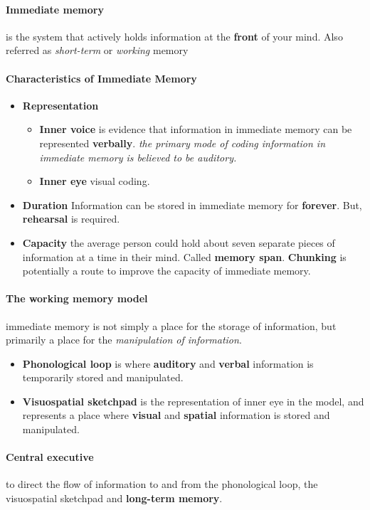\documentclass{article}
\begin{document}
	\paragraph{Immediate memory} is the system that actively holds information at the \textbf{front} of your mind. Also referred as \emph{short-term} or \emph{working} memory
	\paragraph{Characteristics of Immediate Memory}
	\begin{itemize}
		\item \textbf{Representation}
		\begin{itemize}
			\item \textbf{Inner voice} is evidence that information in immediate memory can be represented \textbf{verbally}. \emph{the primary mode of coding information in immediate memory is believed to be auditory.}
			\item \textbf{Inner eye} visual coding.
		\end{itemize}
		\item \textbf{Duration} Information can be stored in immediate memory for \textbf{forever}. But, \textbf{rehearsal} is required.
		\item \textbf{Capacity} the average person could hold about seven separate pieces of information at a time in their mind. Called \textbf{memory span}. \textbf{Chunking} is potentially a route to improve the capacity of immediate memory.
	\end{itemize}
	
	\paragraph{The working memory model} immediate memory is not simply a place for the storage of information, but primarily a place for the \emph{manipulation of information}.
	\begin{itemize}
		\item \textbf{Phonological loop} is where \textbf{auditory} and \textbf{verbal} information is temporarily stored and manipulated.	
		\item \textbf{Visuospatial sketchpad} is the representation of inner eye in the model, and represents a place where \textbf{visual} and \textbf{spatial} information is stored and manipulated.
	\end{itemize}
	\paragraph{Central executive} to direct the flow of information to and from the phonological loop, the visuospatial sketchpad and \textbf{long-term memory}.
\end{document}
